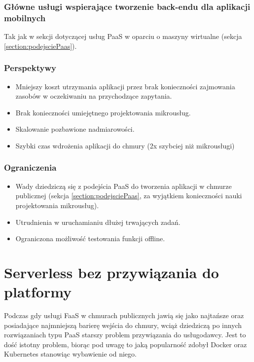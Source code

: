 \documentclass[12pt,a4paper,twoside,titlepage,openright]{book}
\begin{document}
\subsubsection{Główne usługi wspierające tworzenie back-endu dla aplikacji mobilnych}
Tak jak w sekcji dotyczącej usług PaaS w oparciu o maszyny wirtualne (sekcja \ref{section:podejsciePaas}).

\subsubsection{Perspektywy}
\begin{itemize}
\item Mniejszy koszt utrzymania aplikacji przez brak konieczności zajmowania zasobów w oczekiwaniu na przychodzące zapytania.
\item Brak konieczności umiejętnego projektowania mikrousług.
\item Skalowanie pozbawione nadmiarowości.
\item Szybki czas wdrożenia aplikacji do chmury (2x szybciej niż mikrousługi) \cite{serverlessMaddie}
\end{itemize}

\subsubsection{Ograniczenia}
\begin{itemize}
\item Wady dziedziczą się z podejścia PaaS do tworzenia aplikacji w chmurze publicznej (sekcja \ref{section:podejsciePaas}, za wyjątkiem konieczności nauki projektowania mikrousług).
\item Utrudnienia w uruchamianiu dłużej trwających zadań.
\item Ograniczona możliwość testowania funkcji offline.
\end{itemize}



\section{Serverless bez przywiązania do platformy} 

Podczas gdy usługi FaaS w chmurach publicznych jawią się jako najtańsze oraz posiadające najmniejszą barierę wejścia do chmury, wciąż dziedziczą po innych rozwiązaniach typu PaaS starszy problem przywiązania do usługodawcy. Jest to dość istotny problem, biorąc pod uwagę to jaką popularność zdobył Docker oraz Kubernetes stanowiąc wybawienie od niego.
\end{document}
